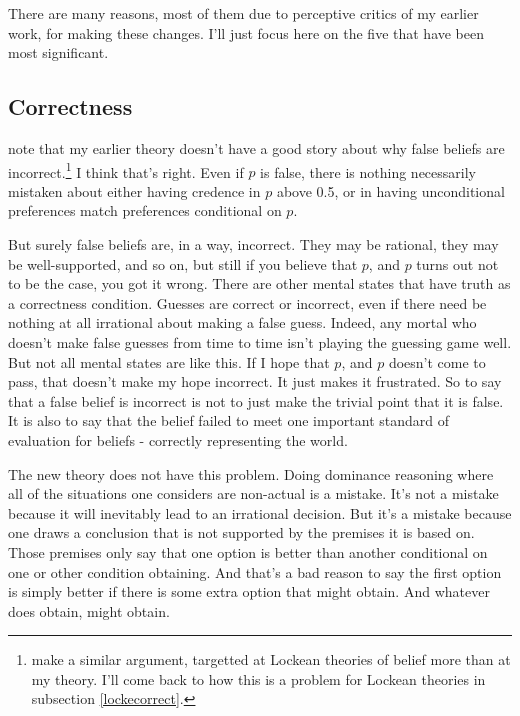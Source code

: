 \documentclass[11pt,]{book}
\let\rmarkdownfootnote\footnote%
\def\footnote{\protect\rmarkdownfootnote}
\begin{document}
There are many reasons, most of them due to perceptive critics of my earlier work, for making these changes. I'll just focus here on the five that have been most significant.

\hypertarget{mecorrect}{%
\subsection{Correctness}\label{mecorrect}}

\citet{RossSchroeder2014} note that my earlier theory doesn't have a good story about why false beliefs are incorrect.\footnote{\citet{FantlMcGrath2009} make a similar argument, targetted at Lockean theories of belief more than at my theory. I'll come back to how this is a problem for Lockean theories in subsection \ref{lockecorrect}.} I think that's right. Even if \(p\) is false, there is nothing necessarily mistaken about either having credence in \(p\) above 0.5, or in having unconditional preferences match preferences conditional on \(p\).

But surely false beliefs are, in a way, incorrect. They may be rational, they may be well-supported, and so on, but still if you believe that \(p\), and \(p\) turns out not to be the case, you got it wrong. There are other mental states that have truth as a correctness condition. Guesses are correct or incorrect, even if there need be nothing at all irrational about making a false guess. Indeed, any mortal who doesn't make false guesses from time to time isn't playing the guessing game well. But not all mental states are like this. If I hope that \(p\), and \(p\) doesn't come to pass, that doesn't make my hope incorrect. It just makes it frustrated. So to say that a false belief is incorrect is not to just make the trivial point that it is false. It is also to say that the belief failed to meet one important standard of evaluation for beliefs - correctly representing the world.

The new theory does not have this problem. Doing dominance reasoning where all of the situations one considers are non-actual is a mistake. It's not a mistake because it will inevitably lead to an irrational decision. But it's a mistake because one draws a conclusion that is not supported by the premises it is based on. Those premises only say that one option is better than another conditional on one or other condition obtaining. And that's a bad reason to say the first option is simply better if there is some extra option that might obtain. And whatever does obtain, might obtain.
\end{document}
